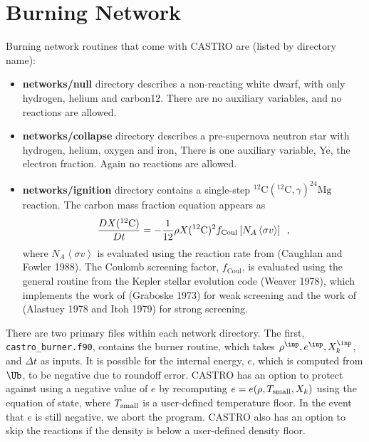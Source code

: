 \section{Burning Network}
Burning network routines that come with CASTRO are (listed by directory name):
\begin{itemize}
\item {\bf networks/null} directory describes a non-reacting white dwarf,
with only hydrogen, helium and carbon12.   There are
no auxiliary variables, and no reactions are allowed.
\item {\bf networks/collapse} directory describes a pre-supernova neutron
star with hydrogen, helium, oxygen and iron, There is one auxiliary
variable, Ye, the electron fraction.  Again no reactions are
allowed.
\item {\bf networks/ignition} directory contains a single-step
$^{12}\mathrm{C}(^{12}\mathrm{C},\gamma)^{24}\mathrm{Mg}$ reaction.
The carbon mass fraction equation appears as
\begin{equation}
\frac{D X(^{12}\mathrm{C})}{Dt} = - \frac{1}{12} \rho X(^{12}\mathrm{C})^2
    f_\mathrm{Coul} \left [N_A \left <\sigma v \right > \right]\enskip,
\end{equation}
where $N_A \left <\sigma v\right>$ is evaluated using the reaction
rate from (Caughlan and Fowler 1988).  The Coulomb screening factor,
$f_\mathrm{Coul}$, is evaluated using the general routine from the
Kepler stellar evolution code (Weaver 1978), which implements
the work of (Graboske 1973) for weak screening and the work of
(Alastuey 1978 and Itoh 1979) for strong screening.
\end{itemize}

There are two primary files within each network directory. The first,
{\tt castro\_burner.f90}, contains the burner routine, 
which takes $\rho^\inp, e^\inp, X_k^\inp$, and $\Delta t$ as inputs.
It is possible for the internal energy, $e$, which is computed from $\Ub$, to be
negative due to roundoff error.  CASTRO has an option to protect against using a 
negative value of $e$ by recomputing $e = e(\rho,T_{\rm small},X_k)$ using the 
equation of state, where $T_{\rm small}$ is a user-defined temperature floor.  In the 
event that $e$ is still negative, we abort the program.  CASTRO also has an option to
skip the reactions if the density is below a user-defined density floor.

